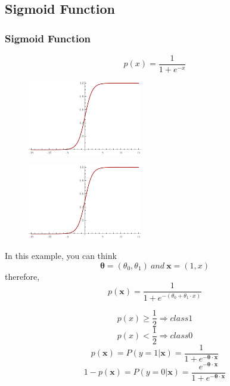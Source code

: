 \documentclass{beamer}
\begin{document}
\subsection{Sigmoid Function}
\begin{frame}
\frametitle{Sigmoid Function}
\[p(x)=\frac{1}{1+e^{-x}}\]
\begin{figure}[t]
\includegraphics[width=5cm]{graphics/1d-sigmoid}
\centering
\end{figure}
\end{frame}
\begin{frame}
\begin{multicols}{2} %
\begin{figure}[t]
\includegraphics[width=5cm]{graphics/1d-sigmoid}
\centering
\end{figure}
\columnbreak  %
In this example, you can think 
\[ \bm{\theta} = (\theta_{0}, \theta_{1}) \ and \ \mathbf{x} = (1, x)\]
therefore, 
\[p(\mathbf{x}) =  \frac{1}{1+e^{- ( \theta_{0} +  \theta_{1} \cdot  x )}} \]
\end{multicols}

\begin{multicols}{2}
\[p(x) \geq \frac{1}{2}  \Rightarrow class 1\]
\[p(x)<\frac{1}{2}  \Rightarrow class 0\]
\columnbreak 
\[p(\mathbf{x})=P(y=1|\mathbf{x}) = \frac{1}{1+e^{-\bm{\theta} \cdot\mathbf{x}}}\]
\[1-p(\mathbf{x})=P(y=0|\mathbf{x}) = \frac{e^{-\bm{\theta} \cdot \mathbf{x}}} {1+e^{-\bm{\theta}\cdot \mathbf{x}}} \]
\end{multicols}

\end{frame}
\end{document}
